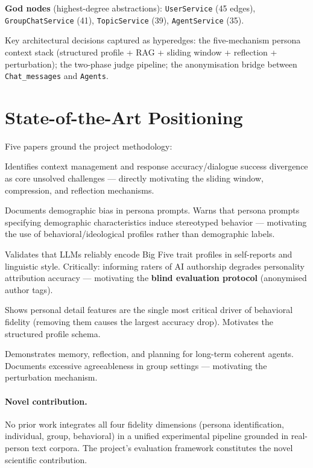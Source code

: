 \documentclass[12pt,a4paper]{article}
\begin{document}
\textbf{God nodes} (highest-degree abstractions): \texttt{UserService} (45 edges),
\texttt{GroupChatService} (41), \texttt{TopicService} (39), \texttt{AgentService} (35).

Key architectural decisions captured as hyperedges: the five-mechanism persona context stack
(structured profile + RAG + sliding window + reflection + perturbation); the two-phase judge
pipeline; the anonymisation bridge between \texttt{Chat\_messages} and \texttt{Agents}.

\section{State-of-the-Art Positioning}

Five papers ground the project methodology:

\begin{description}[leftmargin=0em]
  \item[Wason et al.\ (2024)] Identifies context management and response accuracy/dialogue
        success divergence as core unsolved challenges --- directly motivating the sliding
        window, compression, and reflection mechanisms.
  \item[Salewski et al.\ (2023)] Documents demographic bias in persona prompts. Warns that
        persona prompts specifying demographic characteristics induce stereotyped behavior ---
        motivating the use of behavioral/ideological profiles rather than demographic labels.
  \item[Jiang et al.\ (2024) --- PersonaLLM] Validates that LLMs reliably encode Big Five
        trait profiles in self-reports and linguistic style. Critically: informing raters
        of AI authorship degrades personality attribution accuracy --- motivating the
        \textbf{blind evaluation protocol} (anonymised author tags).
  \item[Zhou et al.\ (2025)] Shows personal detail features are the single most critical
        driver of behavioral fidelity (removing them causes the largest accuracy drop).
        Motivates the structured profile schema.
  \item[Park et al.\ (2023) --- Generative Agents] Demonstrates memory, reflection, and
        planning for long-term coherent agents. Documents excessive agreeableness in
        group settings --- motivating the perturbation mechanism.
\end{description}

\paragraph{Novel contribution.}
No prior work integrates all four fidelity dimensions (persona identification, individual,
group, behavioral) in a unified experimental pipeline grounded in real-person text corpora.
The project's evaluation framework constitutes the novel scientific contribution.
\end{document}
